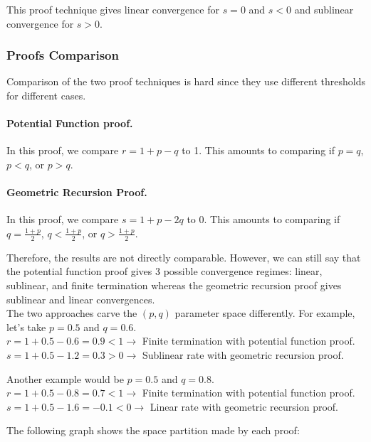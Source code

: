 \documentclass{article}
\begin{document}
This proof technique gives linear convergence for $s = 0$ and $s < 0$ and sublinear convergence for $s > 0$.

\subsubsection{Proofs Comparison}

Comparison of the two proof techniques is hard since they use different thresholds for different cases. 
\paragraph{Potential Function proof.} In this proof, we compare $r = 1+p-q$ to 1. This amounts to comparing if $p = q$, 
$p < q$, or $p > q$.

\paragraph{Geometric Recursion Proof.} In this proof, we compare $s = 1+p-2q$ to 0. 
This amounts to comparing if $q = \frac{1+p}{2}$, $q < \frac{1+p}{2}$, or $q > \frac{1+p}{2}$.

Therefore, the results are not directly comparable. However, we can still say that the potential function proof
gives 3 possible convergence regimes: linear, sublinear, and finite termination whereas the geometric recursion proof
gives sublinear and linear convergences.\\
The two approaches carve the $(p, q)$ parameter space differently.
For example, let's take $p = 0.5$ and $q = 0.6$.\\
$r = 1 + 0.5 - 0.6 = 0.9 < 1 \rightarrow$ Finite termination with potential function proof.\\
$s = 1 + 0.5 - 1.2 = 0.3 > 0 \rightarrow$ Sublinear rate with geometric recursion proof.

\noindent Another example would be $p = 0.5$ and $q = 0.8$.\\
$r = 1 + 0.5 - 0.8 = 0.7 < 1 \rightarrow$ Finite termination with potential function proof.\\
$s = 1 + 0.5 - 1.6 = -0.1 < 0 \rightarrow$ Linear rate with geometric recursion proof. 

The following graph shows the space partition made by each proof:

\end{document}
